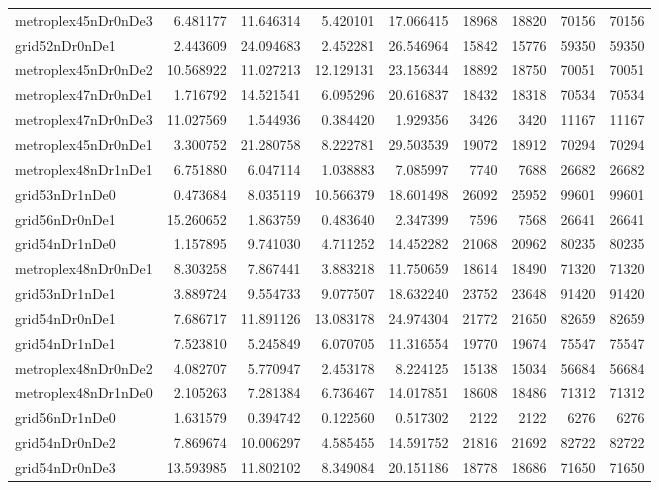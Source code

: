 \begin{longtable}{|l|r|r|r|r|r|r|r|r|}
metroplex45nDr0nDe3 & 6.481177 & 11.646314 & 5.420101 & 17.066415 & 18968 & 18820 & 70156 & 70156 \\
grid52nDr0nDe1 & 2.443609 & 24.094683 & 2.452281 & 26.546964 & 15842 & 15776 & 59350 & 59350 \\
metroplex45nDr0nDe2 & 10.568922 & 11.027213 & 12.129131 & 23.156344 & 18892 & 18750 & 70051 & 70051 \\
metroplex47nDr0nDe1 & 1.716792 & 14.521541 & 6.095296 & 20.616837 & 18432 & 18318 & 70534 & 70534 \\
metroplex47nDr0nDe3 & 11.027569 & 1.544936 & 0.384420 & 1.929356 & 3426 & 3420 & 11167 & 11167 \\
metroplex45nDr0nDe1 & 3.300752 & 21.280758 & 8.222781 & 29.503539 & 19072 & 18912 & 70294 & 70294 \\
metroplex48nDr1nDe1 & 6.751880 & 6.047114 & 1.038883 & 7.085997 & 7740 & 7688 & 26682 & 26682 \\
grid53nDr1nDe0 & 0.473684 & 8.035119 & 10.566379 & 18.601498 & 26092 & 25952 & 99601 & 99601 \\
grid56nDr0nDe1 & 15.260652 & 1.863759 & 0.483640 & 2.347399 & 7596 & 7568 & 26641 & 26641 \\
grid54nDr1nDe0 & 1.157895 & 9.741030 & 4.711252 & 14.452282 & 21068 & 20962 & 80235 & 80235 \\
metroplex48nDr0nDe1 & 8.303258 & 7.867441 & 3.883218 & 11.750659 & 18614 & 18490 & 71320 & 71320 \\
grid53nDr1nDe1 & 3.889724 & 9.554733 & 9.077507 & 18.632240 & 23752 & 23648 & 91420 & 91420 \\
grid54nDr0nDe1 & 7.686717 & 11.891126 & 13.083178 & 24.974304 & 21772 & 21650 & 82659 & 82659 \\
grid54nDr1nDe1 & 7.523810 & 5.245849 & 6.070705 & 11.316554 & 19770 & 19674 & 75547 & 75547 \\
metroplex48nDr0nDe2 & 4.082707 & 5.770947 & 2.453178 & 8.224125 & 15138 & 15034 & 56684 & 56684 \\
metroplex48nDr1nDe0 & 2.105263 & 7.281384 & 6.736467 & 14.017851 & 18608 & 18486 & 71312 & 71312 \\
grid56nDr1nDe0 & 1.631579 & 0.394742 & 0.122560 & 0.517302 & 2122 & 2122 & 6276 & 6276 \\
grid54nDr0nDe2 & 7.869674 & 10.006297 & 4.585455 & 14.591752 & 21816 & 21692 & 82722 & 82722 \\
grid54nDr0nDe3 & 13.593985 & 11.802102 & 8.349084 & 20.151186 & 18778 & 18686 & 71650 & 71650 \\

\end{longtable}

